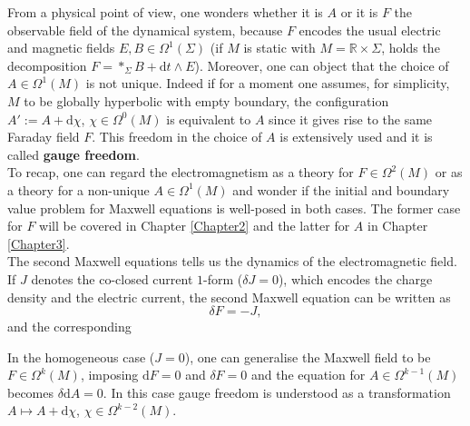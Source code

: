 From a physical point of view, one wonders whether it is $A$ or it is $F$ the observable field of the dynamical system, because $F$ encodes the usual electric and magnetic fields $E,B\in\Omega^1(\Sigma)$ (if $M$ is static with $M=\mathbb{R}\times\Sigma$, holds the decomposition $F=\ast_{\Sigma}B+\mathrm{d}t\wedge E$). Moreover, one can object that the choice of $A\in\Omega^{1}(M)$ is not unique. Indeed if for a moment one assumes, for simplicity, $M$ to be globally hyperbolic with empty boundary, the configuration $A':=A+\mathrm{d}\chi$, $\chi\in\Omega^0(M)$ is equivalent to $A$ since it gives rise to the same Faraday field $F$. This freedom in the choice of $A$ is extensively used and it is called \textbf{gauge freedom}.\\

To recap, one can regard the electromagnetism as a theory for $F\in\Omega^2(M)$ or as a theory for a non-unique $A\in\Omega^1(M)$ and wonder if the initial and boundary value problem for Maxwell equations is well-posed in both cases. The former case for $F$ will be covered in Chapter \ref{Chapter2} and the latter for $A$ in Chapter \ref{Chapter3}.\\

The second Maxwell equations tells us the dynamics of the electromagnetic field. If $J$ denotes the co-closed current $1$-form ($\delta J=0$), which encodes the charge density and the electric current, the second Maxwell equation can be written as
\begin{equation}\label{Eqn: second maxwell}
	\delta F=-J,
\end{equation}
and the corresponding

In the homogeneous case ($J=0$), one can generalise the Maxwell field to be $F\in\Omega^k(M)$, imposing $\mathrm{d}F=0$ and $\delta F=0$ and the equation for $A\in\Omega^{k-1}(M)$ becomes $\delta\mathrm{d}A=0$. In this case gauge freedom is understood as a transformation $A\mapsto A+\mathrm{d}\chi$, $\chi\in\Omega^{k-2}(M)$.

